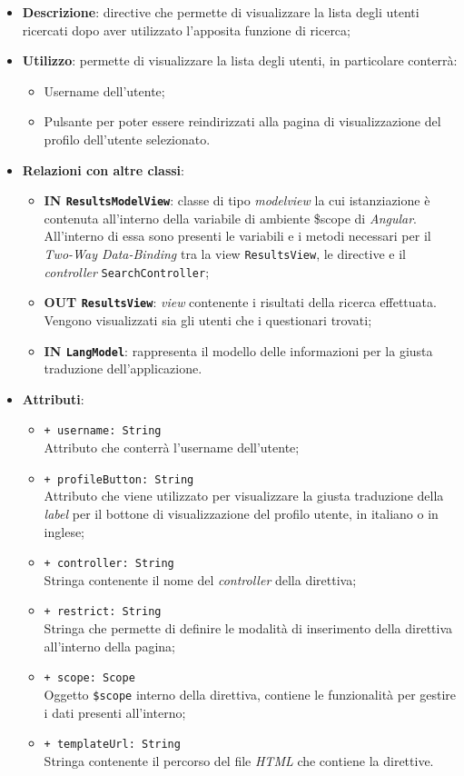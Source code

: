 \begin{itemize}
	\item \textbf{Descrizione}: directive che permette di visualizzare la lista degli utenti ricercati dopo aver utilizzato l'apposita funzione di ricerca;
	\item \textbf{Utilizzo}: permette di visualizzare la lista degli utenti, in particolare conterrà:
	\begin{itemize}
		\item Username dell'utente;
		\item Pulsante per poter essere reindirizzati alla pagina di visualizzazione del profilo dell'utente selezionato.
	\end{itemize}
	\item \textbf{Relazioni con altre classi}:
	\begin{itemize}
		\item \textbf{IN \texttt{ResultsModelView}}: classe di tipo \textit{modelview} la cui istanziazione è contenuta all'interno della variabile di ambiente \$scope di \textit{Angular}. All'interno di essa sono presenti le variabili e i metodi necessari per il \textit{Two-Way Data-Binding} tra la view \texttt{ResultsView}, le directive e il \textit{controller} \texttt{SearchController};
		\item \textbf{OUT \texttt{ResultsView}}: \textit{view} contenente i risultati della ricerca effettuata. Vengono visualizzati sia gli utenti che i questionari trovati;
		\item \textbf{IN \texttt{LangModel}}: rappresenta il modello delle informazioni per la giusta traduzione dell'applicazione.
	\end{itemize}
	\item \textbf{Attributi}:
	\begin{itemize}
		\item \texttt{+ username: String} \\ Attributo che conterrà l'username dell'utente;
		\item \texttt{+ profileButton: String} \\ Attributo che viene utilizzato per visualizzare la giusta traduzione della \textit{label} per il bottone di visualizzazione del profilo utente, in italiano o in inglese;
		\item \texttt{+ controller: String} \\ Stringa contenente il nome del \textit{controller} della direttiva;
		\item \texttt{+ restrict: String} \\ Stringa che permette di definire le modalità di inserimento della direttiva all'interno della pagina;
		\item \texttt{+ scope: Scope} \\Oggetto \texttt{\$scope} interno della direttiva, contiene le funzionalità per gestire i dati presenti all'interno;
		\item \texttt{+ templateUrl: String} \\ Stringa contenente il percorso del file \textit{HTML} che contiene la direttive.
	\end{itemize}
\end{itemize}
